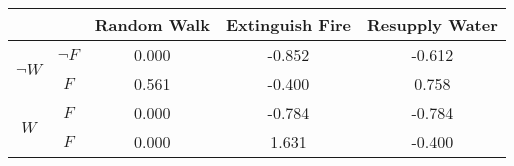 \begin{center}
\begin{tabular}{|c|c|c|c|c|}
  \hline
  &   & Random Walk & Extinguish Fire & Resupply Water\\
  \hline
  \multirow{2}{*}{$\neg W$} & $\neg F$ & 0.000 & -0.852 & -0.612\\
  \cline{2-5}
   & $F$ & 0.561 & -0.400 & 0.758\\
  \hline
  \multirow{2}{*}{$W$} & $F$ & 0.000 & -0.784 & -0.784\\
  \cline{2-5}
   & $F$ & 0.000 & 1.631 & -0.400\\
  \hline
\end{tabular}
\end{center}
